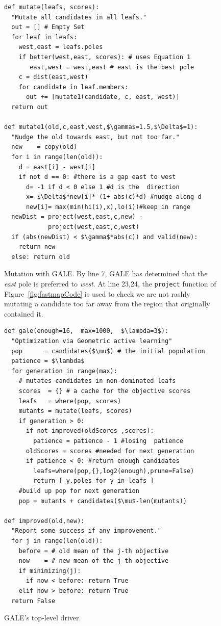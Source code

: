 \documentclass[10pt,journal,compsoc]{IEEEtran}
\newcommand{\fig}[1]{Figure~\ref{fig:#1}}
\begin{document}
\begin{figure}[!t]
\begin{minipage}{3.2in}
\begin{lstlisting}[mathescape,frame=r,numbers=right]
def mutate(leafs, scores): 
  "Mutate all candidates in all leafs."
  out = [] # Empty Set
  for leaf in leafs:
    west,east = leafs.poles
    if better(west,east, scores): # uses Equation 1
       east,west = west,east # east is the best pole
    c = dist(east,west)
    for candidate in leaf.members:
      out += [mutate1(candidate, c, east, west)]
  return out 

def mutate1(old,c,east,west,$\gamma$=1.5,$\Delta$=1): 
  "Nudge the old towards east, but not too far."
  new    = copy(old)
  for i in range(len(old)):
    d = east[i] - west[i]
    if not d == 0: #there is a gap east to west
      d= -1 if d < 0 else 1 #d is the  direction
      x= $\Delta$*new[i]* (1+ abs(c)*d) #nudge along d 
      new[i]= max(min(hi(i),x),lo(i))#keep in range
  newDist = project(west,east,c,new) -
            project(west,east,c,west)
  if (abs(newDist) < $\gamma$*abs(c)) and valid(new): 
    return new
  else: return old
\end{lstlisting}

\caption{Mutation with GALE.
By line 7, GALE has determined that the {\em east}
pole is preferred  to {\em west}.
At line 23,24, the {\tt project}
function of \fig{fastmapCode}  is used
to check 
we are not rashly mutating a candidate too far away from
the region that originally contained it.}
\label{fig:mutantCode} 
\end{minipage}
\end{figure}
\begin{figure}[!t]
\begin{minipage}{3.2in}
\begin{lstlisting}[mathescape,frame=r,numbers=right]
def gale(enough=16,  max=1000,  $\lambda=3$):
  "Optimization via Geometric active learning"
  pop      = candidates($\mu$) # the initial population
  patience = $\lambda$
  for generation in range(max):
    # mutates candidates in non-dominated leafs
    scores  = {} # a cache for the objective scores 
    leafs   = where(pop, scores)
    mutants = mutate(leafs, scores)
    if generation > 0:  
      if not improved(oldScores ,scores):
        patience = patience - 1 #losing  patience
      oldScores = scores #needed for next generation
      if patience < 0: #return enough candidates
        leafs=where(pop,{},log2(enough),prune=False)
        return [ y.poles for y in leafs ] 
    #build up pop for next generation
    pop = mutants + candidates($\mu$-len(mutants))   

def improved(old,new):
  "Report some success if any improvement."
  for j in range(len(old)):
    before = # old mean of the j-th objective
    now    = # new mean of the j-th objective
    if minimizing(j):
      if now < before: return True
    elif now > before: return True
  return False 
\end{lstlisting}

\caption{GALE's top-level driver.}
\label{fig:galeCode}
\end{minipage}
\end{figure}
\end{document}
